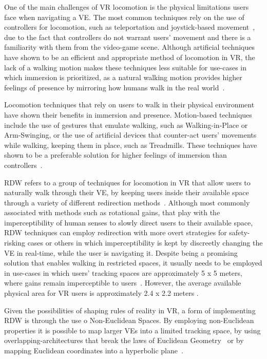One of the main challenges of \gls{VR} locomotion is the physical limitations users face when navigating a \gls{VE}.
The most common techniques rely on the use of controllers for locomotion, such as teleportation and joystick-based movement~\cite{Coomer2018}, 
due to the fact that controllers do not warrant users' movement and there is a familiarity with them from the video-game scene.
Although artificial techniques have shown to be an efficient and appropriate method of locomotion in \gls{VR}, the lack of a 
walking motion makes these techniques less suitable for use-cases in which immersion is prioritized, as a natural walking motion 
provides higher feelings of presence by mirroring how humans walk in the real world~\cite{Nilsson2018}.

Locomotion techniques that rely on users to walk in their physical environment have shown their benefits in immersion and presence. Motion-based techniques 
include the use of gestures that emulate walking, such as Walking-in-Place or Arm-Swinging, or the use of artificial 
devices that counter-act users' movements while walking, keeping them in place, such as Treadmills. These techniques have 
shown to be a preferable solution for higher feelings of immersion than controllers~\cite{Nilsson2018}.

\gls{RDW} refers to a group of techniques for locomotion in \gls{VR} that allow users to naturally walk through their \gls{VE}, by keeping  
users inside their available space through a variety of different redirection methods~\cite{8255772}. Although most commonly associated with methods such as 
rotational gains, that play with the imperceptibility of human senses to slowly direct users to their available space,
\gls{RDW} techniques can employ redirection with more overt strategies for 
safety-risking cases or others in which imperceptibility is kept by discreetly changing the \gls{VE} in real-time, 
while the user is navigating it. Despite being a promising solution that enables walking in restricted spaces, 
it usually needs to be employed in use-cases in which users' tracking spaces are approximately 5 x 5 meters, 
where gains remain imperceptible to users~\cite{Razzaque2001, Steinicke2010}. However, the average available physical area for 
\gls{VR} users is approximately 2.4 x 2.2 meters \cite{Azmandian2015, Liu2018b}. 

Given the possibilities of shaping rules of reality in \gls{VR}, a form of implementing \gls{RDW} is through the use o Non-Euclidean Spaces. 
By employing non-Euclidean properties it is possible to map larger \glspl{VE} into a limited tracking space, by using overlapping-architectures
that break the laws of Euclidean Geometry~\cite{Suma2012,Vasylevska2017} or by mapping Euclidean coordinates into a hyperbolic plane~\cite{Pisani2019, Rebelo2022}. 

